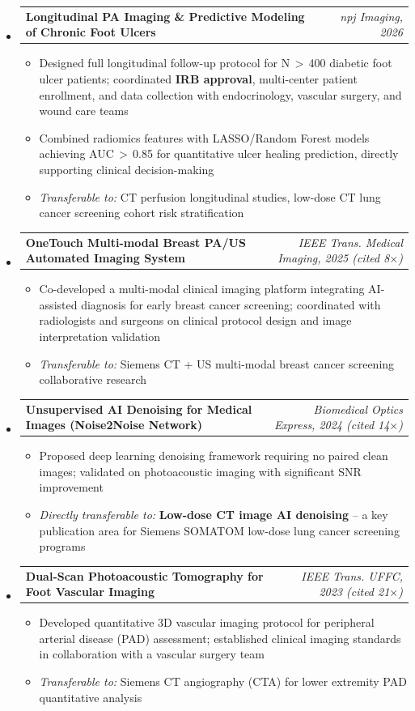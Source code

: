 \documentclass[letterpaper,10pt]{article}
\makeatletter
\newcommand{\projheading}[2]{
  \vspace{1pt}\item
  \begin{tabular*}{0.97\textwidth}[t]{l@{\extracolsep{\fill}}r}
    \textbf{#1} & \textit{\small#2} \\
  \end{tabular*}\vspace{2pt}
}
\newcommand{\projItemListStart}{\begin{itemize}[leftmargin=0.2in, topsep=3pt]}
\newcommand{\projItemListEnd}{\end{itemize}\vspace{2pt}}
\makeatother
\begin{document}
\begin{itemize}[leftmargin=0in, label={}]

  \projheading{Longitudinal PA Imaging \& Predictive Modeling of Chronic Foot Ulcers}{npj Imaging, 2026}
  \projItemListStart
    \item Designed full longitudinal follow-up protocol for N\,$>$\,400 diabetic foot ulcer patients; coordinated \textbf{IRB approval}, multi-center patient enrollment, and data collection with endocrinology, vascular surgery, and wound care teams
    \item Combined radiomics features with LASSO/Random Forest models achieving AUC\,$>$\,0.85 for quantitative ulcer healing prediction, directly supporting clinical decision-making
    \item \textit{Transferable to:} CT perfusion longitudinal studies, low-dose CT lung cancer screening cohort risk stratification
  \projItemListEnd

  \projheading{OneTouch Multi-modal Breast PA/US Automated Imaging System}{IEEE Trans. Medical Imaging, 2025 (cited 8$\times$)}
  \projItemListStart
    \item Co-developed a multi-modal clinical imaging platform integrating AI-assisted diagnosis for early breast cancer screening; coordinated with radiologists and surgeons on clinical protocol design and image interpretation validation
    \item \textit{Transferable to:} Siemens CT + US multi-modal breast cancer screening collaborative research
  \projItemListEnd

  \projheading{Unsupervised AI Denoising for Medical Images (Noise2Noise Network)}{Biomedical Optics Express, 2024 (cited 14$\times$)}
  \projItemListStart
    \item Proposed deep learning denoising framework requiring no paired clean images; validated on photoacoustic imaging with significant SNR improvement
    \item \textit{Directly transferable to:} \textbf{Low-dose CT image AI denoising} -- a key publication area for Siemens SOMATOM low-dose lung cancer screening programs
  \projItemListEnd

  \projheading{Dual-Scan Photoacoustic Tomography for Foot Vascular Imaging}{IEEE Trans. UFFC, 2023 (cited 21$\times$)}
  \projItemListStart
    \item Developed quantitative 3D vascular imaging protocol for peripheral arterial disease (PAD) assessment; established clinical imaging standards in collaboration with a vascular surgery team
    \item \textit{Transferable to:} Siemens CT angiography (CTA) for lower extremity PAD quantitative analysis
  \projItemListEnd


\end{itemize}
\end{document}

